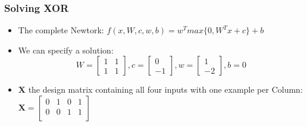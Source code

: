 \documentclass{beamer}
\begin{document}
\begin{frame}
	\frametitle{Solving XOR}
	\begin{itemize}
		\item The complete Newtork: $f(x, W, c, w, b) = w^Tmax\{0,W^Tx + c\} + b$
			\pause
		\item We can specify a solution:
			$$ W = \begin{bmatrix} 1 & 1\\
						1 & 1
				\end{bmatrix} , c = \begin{bmatrix}
0\\
-1 
\end{bmatrix} , w = \begin{bmatrix}
1\\
-2
\end{bmatrix}, b = 0$$
\pause
\item $\mathbf{X}$ the design matrix containing all four inputs with one example per Column: $\mathbf{X} = \begin{bmatrix}
		0 & 1 & 0 & 1\\
	0 & 0 & 1 & 1 \\
\end{bmatrix}$
	\end{itemize}	
\end{frame}
\end{document}
